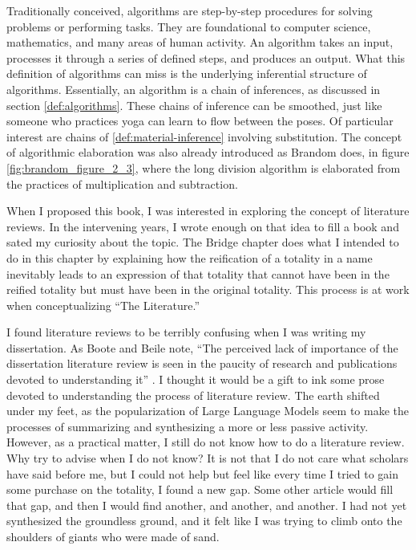 \documentclass[12pt]{book}
\begin{document}
Traditionally conceived, algorithms are step-by-step procedures for solving problems or performing tasks. They are foundational to computer science, mathematics, and many areas of human activity. An algorithm takes an input, processes it through a series of defined steps, and produces an output. What this definition of algorithms can miss is the underlying inferential structure of algorithms. Essentially, an algorithm is a chain of inferences, as discussed in section \ref{def:algorithms}. These chains of inference can be smoothed, just like someone who practices yoga can learn to flow between the poses. Of particular interest are chains of \ref{def:material-inference} involving substitution. The concept of algorithmic elaboration was also already introduced as Brandom does, in figure \ref{fig:brandom_figure_2_3}, where the long division algorithm is elaborated from the practices of multiplication and subtraction. 

When I proposed this book, I was interested in exploring the concept of literature reviews. In the intervening years, I wrote enough on that idea to fill a book and sated my curiosity about the topic. The Bridge chapter does what I intended to do in this chapter by explaining how the reification of a totality in a name inevitably leads to an expression of that totality that cannot have been in the reified totality but must have been in the original totality. This process is at work when conceptualizing ``The Literature.'' 

I found literature reviews to be terribly confusing when I was writing my dissertation. As Boote and Beile note, ``The perceived lack of importance of the dissertation literature review is seen in the paucity of research and publications devoted to understanding it'' \parencite*[4]{boote2005}. I thought it would be a gift to ink some prose devoted to understanding the process of literature review. The earth shifted under my feet, as the popularization of Large Language Models seem to make the processes of summarizing and synthesizing a more or less passive activity. However, as a practical matter, I still do not know how to do a literature review. Why try to advise when I do not know? It is not that I do not care what scholars have said before me, but I could not help but feel like every time I tried to gain some purchase on the totality, I found a new gap. Some other article would fill that gap, and then I would find another, and another, and another. I had not yet synthesized the groundless ground, and it felt like I was trying to climb onto the shoulders of giants who were made of sand. 
\end{document}
